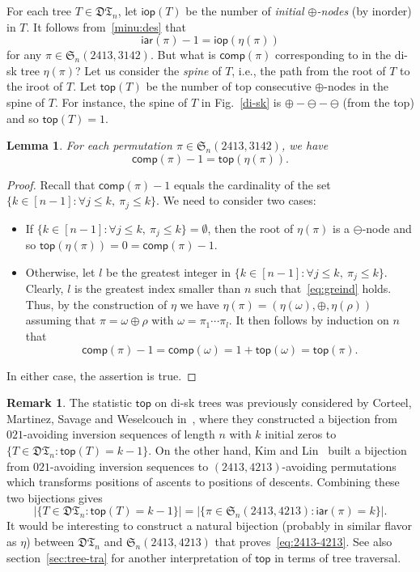 \documentclass[12pt]{amsart}
\numberwithin{equation}{section}
\def\red{\textcolor{red}}
\theoremstyle{plain}
\newtheorem{lemma}[theorem]{Lemma}
\theoremstyle{definition}
\newtheorem{remark}[theorem]{Remark}
\def\S{\mathfrak{S}}
\def\iar{\mathsf{iar}}
\def\comp{\mathsf{comp}}
\newcommand{\DT}{\mathfrak{DT}}
\def\iop{\mathsf{iop}}
\def\top{\mathsf{top}}
\begin{document}
For each tree $T\in\DT_n$, let $\iop(T)$ be the number of {\em initial $\oplus$-nodes}  (by inorder) in $T$.
It follows from~\eqref{minu:des}  that 
\begin{equation}\label{eq:iop}
\iar(\pi)-1=\iop(\eta(\pi))
\end{equation}
 for any  $\pi\in\S_n(2413,3142)$. 
 But what is $\comp(\pi)$ corresponding to in the di-sk tree $\eta(\pi)$? Let us consider the {\em spine} of $T$, i.e., the path from the root of $T$ to the iroot of $T$. Let $\top(T)$ be the number of top consecutive $\oplus$-nodes in the spine of $T$. For instance, the spine of $T$ in Fig.~\ref{di-sk} is $\oplus-\ominus-\ominus$ (from the top) and so $\top(T)=1$.
 \red{
 
 
 
 }
\begin{lemma}\label{lem:sep2}
For each permutation $\pi\in\S_n(2413,3142)$,  we have  
$$\comp(\pi)-1=\top(\eta(\pi)).
$$
\end{lemma}
\begin{proof}
Recall that $\comp(\pi)-1$ equals the cardinality of the set $\{k\in [n-1]: \forall j\leq k,\: \pi_j\leq k\}$. 
We need to consider two cases:
\begin{itemize}
\item If $\{k\in [n-1]: \forall j\leq k,\: \pi_j\leq k\}=\emptyset$, then the root of $\eta(\pi)$ is a $\ominus$-node and so $\top(\eta(\pi))=0=\comp(\pi)-1$. 
\item Otherwise, let $l$ be the greatest integer in $\{k\in [n-1]: \forall j\leq k,\: \pi_j\leq k\}$. Clearly,  $l$ is the greatest index smaller than $n$ such that~\eqref{eq:greind} holds. Thus, by the construction of $\eta$ we have  $\eta(\pi)=(\eta(\omega),\oplus,\eta(\rho))$ assuming that $\pi=\omega\oplus\rho$ with $\omega=\pi_1\cdots\pi_l$. It then follows by induction on $n$ that 
$$
\comp(\pi)-1=\comp(\omega)=1+\top(\omega)=\top(\pi).
$$
\end{itemize}
In either case, the assertion is true. 
\end{proof}
\begin{remark}
The statistic $\top$ on di-sk trees was previously considered by Corteel, Martinez, Savage and Weselcouch in~\cite[Corollary~5]{cor}, where they constructed a bijection from $021$-avoiding inversion sequences of length $n$ with $k$ initial zeros  to $\{T\in\DT_n: \top(T)=k-1\}$. 
On the other hand, Kim and Lin~\cite{LK} built a bijection from $021$-avoiding inversion sequences to $(2413,4213)$-avoiding permutations which transforms positions of ascents to positions of descents. Combining these two bijections gives
\begin{equation}\label{eq:2413-4213}
|\{T\in\DT_n: \top(T)=k-1\}|=|\{\pi\in\S_n(2413,4213): \iar(\pi)=k\}|. 
\end{equation}
It would be interesting to construct a natural bijection (probably in similar flavor  as $\eta$) between $\DT_n$ and $\S_n(2413,4213)$ that proves~\eqref{eq:2413-4213}. 
See also section~\ref{sec:tree-tra} for another interpretation of $\top$ in terms of tree traversal.
\end{remark}
\end{document}
